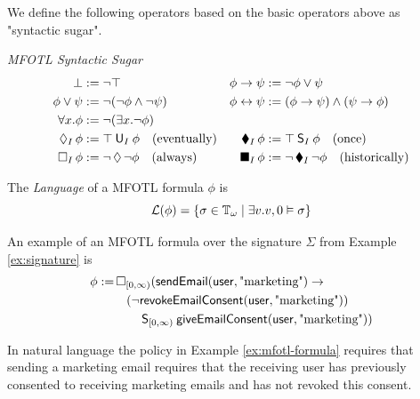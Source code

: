 We define the following operators based on the basic operators above as
"syntactic sugar".
\begin{definition}
    \label{def:mfotl-syntactic-sugar}
    \emph{MFOTL Syntactic Sugar}
    \begin{align*}
        \bot &:= \neg\top &
        \phi \to \psi &:= \neg \phi \vee \psi \\
        \phi \vee \psi &:= \neg(\neg\phi \wedge \neg\psi) &
        \phi \leftrightarrow \psi
            &:= (\phi \to \psi) \wedge (\psi \to \phi) \\
        \forall x. \phi &:= \neg(\exists x. \neg \phi) \\
        \operatorname{\lozenge}_I \phi &:= \top \mathbin{\mathsf{U}}_I \phi \quad \text{(eventually)} &
        \operatorname{\blacklozenge}_I \phi &:= \top \mathbin{\mathsf{S}}_I \phi \quad \text{(once)}\\
        \operatorname{\square}_I \phi &:= \neg \operatorname{\lozenge} \neg \phi \quad \text{(always)} &
        \operatorname{\blacksquare}_I \phi &:= \neg \operatorname{\blacklozenge}_I \neg \phi \quad \text{(historically)}
    \end{align*}    
\end{definition}

\begin{definition}
    \label{def:mfotl-formula-language}
    The \emph{Language} of a MFOTL formula $\phi$ is
    $$
    \mathcal{L}(\phi)
    = \left\lbrace
    \sigma \in \mathbb{T}_\omega \mid \exists v. v,0 \vDash \sigma
    \right\rbrace
    $$
\end{definition}

\begin{example}
    \label{ex:mfotl-formula}
    An example of an MFOTL formula over the signature $\Sigma$ from Example
    \ref{ex:signature} is
    \begin{align*}
        \phi := 
        &\operatorname{\square}_{[0,\infty)}(
            \mathsf{sendEmail}(\mathsf{user}, \text{"marketing"}) 
            \to \\
            & \quad
                (\neg
                \mathsf{revokeEmailConsent}(\mathsf{user}, \text{"marketing"})) \\
                & \qquad
                \mathbin{\mathsf{S}}_{[0,\infty)}
                \mathsf{giveEmailConsent}(\mathsf{user}, \text{"marketing"})
            )
    \end{align*}
\end{example}
In natural language the policy in Example \ref{ex:mfotl-formula}
requires that sending a marketing email requires that
the receiving user has previously consented to
receiving marketing emails and has not revoked this consent.

